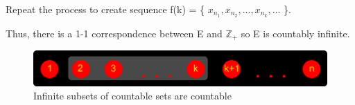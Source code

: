 	Repeat the process to create sequence f(k) = \{ $x_{n_1}, x_{n_2}, ... , x_{n_k} , ...$ \}.

	Thus, there is a 1-1 correspondence between E and $\mathbb{Z}_+$ so
	E is countably infinite.

\begin{figure}[h]
	\centering
	\includegraphics[scale=0.5]{Images/4.3.6.png}
	\caption{Infinite subsets of countable sets are countable}
\end{figure}





